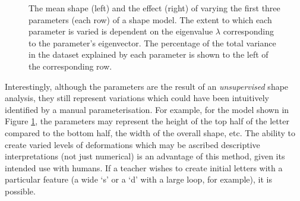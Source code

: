 \documentclass{sig-alternate}
\begin{document}
%
%

\begin{figure}[thpb]
\centering
{}
\caption[The mean shape and the effect of varying the first three parameters of
the shape model derived from PCA from the dataset of print `s'
shapes.]{\label{fig:deviations_sPrint}The mean shape (left) and the effect
    (right) of varying the first three parameters (each row) of a shape model.
     The extent to which each
parameter is varied is dependent on the eigenvalue $\lambda$ corresponding to
the parameter's eigenvector. The percentage of the total variance in the dataset
explained by each parameter is shown to the left of the corresponding row. }

\end{figure}



Interestingly, although the parameters are the result of an \emph{unsupervised} 
shape analysis, they still represent variations which could have
been intuitively identified by a manual parameterisation. For example, for the
model shown in Figure \ref{fig:deviations_sPrint}, the parameters may represent
the height of the top half of the letter compared to the bottom half, the width
of the overall shape, etc. The ability to create varied levels of deformations
which may be ascribed descriptive interpretations (not just numerical) is an
advantage of this method, given its intended use with humans. If a teacher wishes to
create initial letters with a particular feature (a wide `s' or a `d' with a
large loop, for example), it is possible. 
\end{document}
